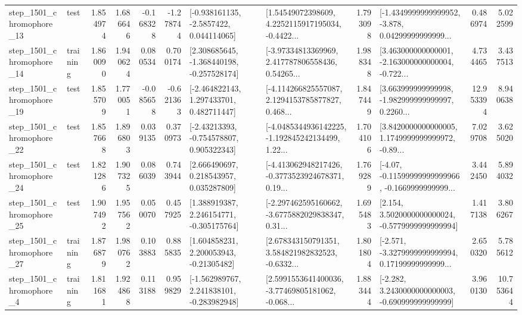 \begin{tabular}{llrrrrllrlrr}
 step\_1501\_chromophore\_13 &      test &      1.854974 &    1.686646 &     -0.168328 & -1.278744 &     [-0.938161135, -2.5857422, 0.044114065] &  [1.54549072398609, 4.2252115917195034, -0.4422... &       1.793098 &  [-1.4349999999999952, -3.878, 0.04299999999999... &            0.486974 &          5.022599 \\
 step\_1501\_chromophore\_14 &  training &      1.860090 &    1.940624 &      0.080534 &  0.700174 &   [2.308685645, -1.368440198, -0.257528174] &  [-3.97334813369969, 2.417787806558436, 0.54265... &       1.988348 &  [3.463000000000001, -2.163000000000004, -0.722... &            4.734465 &          3.437513 \\
 step\_1501\_chromophore\_19 &      test &      1.855709 &    1.770051 &     -0.085658 & -0.621363 &    [-2.464822143, 1.297433701, 0.482711447] &  [-4.114266825557087, 2.1294153785877827, 0.468... &       1.847449 &  [3.663999999999998, -1.982999999999997, 0.2260... &           12.953394 &          8.940638 \\
 step\_1501\_chromophore\_22 &      test &      1.857668 &    1.896803 &      0.039135 &  0.370973 &    [-2.43213393, -0.754578807, 0.905322343] &  [-4.0485344936142225, -1.192845242134499, 1.22... &       1.704106 &  [3.8420000000000005, 1.1749999999999972, -0.89... &            7.029708 &          3.625020 \\
 step\_1501\_chromophore\_24 &      test &      1.821286 &    1.907325 &      0.086039 &  0.743944 &     [2.666490697, 0.218543957, 0.035287809] &  [-4.413062948217426, -0.3773523924678371, 0.19... &       1.769289 &  [-4.07, -0.11599999999999966, -0.1669999999999... &            3.442450 &          5.894032 \\
 step\_1501\_chromophore\_25 &      test &      1.907492 &    1.957562 &      0.050070 &  0.457925 &    [1.388919387, 2.246154771, -0.305175764] &  [-2.297462595160662, -3.6775882029838347, 0.31... &       1.695483 &   [2.154, 3.5020000000000024, -0.5779999999999994] &            1.417138 &          3.806267 \\
 step\_1501\_chromophore\_27 &  training &      1.876879 &    1.980762 &      0.103883 &  0.885835 &     [1.604858231, 2.200053943, -0.21305482] &  [2.678343150791351, 3.584821982832523, -0.6332... &       1.801804 &  [-2.571, -3.3279999999999994, 0.17199999999999... &            2.650320 &          5.785612 \\
  step\_1501\_chromophore\_4 &  training &      1.811681 &    1.924868 &      0.113188 &  0.959829 &   [-1.562989767, 2.241838101, -0.283982948] &  [2.5991553641400036, -3.77469805181062, -0.068... &       1.883444 &   [-2.282, 3.2430000000000003, -0.690999999999999] &            3.960130 &         10.753644 \\

\end{tabular}
